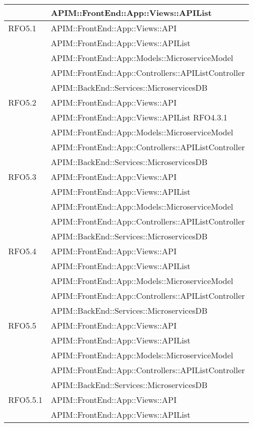 \begin{longtable}{ p{4cm} | p{12cm} }
			& APIM::FrontEnd::App::Views::APIList \\
			\hline		
			RFO5.1
			& APIM::FrontEnd::App::Views::API \\
			& APIM::FrontEnd::App::Views::APIList \\
			& APIM::FrontEnd::App::Models::MicroserviceModel \\
			& APIM::FrontEnd::App::Controllers::APIListController \\
			& APIM::BackEnd::Services::MicroservicesDB \\
			\hline		
			RFO5.2
			& APIM::FrontEnd::App::Views::API \\
			& APIM::FrontEnd::App::Views::APIList RFO4.3.1 \\
			& APIM::FrontEnd::App::Models::MicroserviceModel \\
			& APIM::FrontEnd::App::Controllers::APIListController \\
			& APIM::BackEnd::Services::MicroservicesDB \\
			\hline		
			RFO5.3
			& APIM::FrontEnd::App::Views::API \\
			& APIM::FrontEnd::App::Views::APIList \\
			& APIM::FrontEnd::App::Models::MicroserviceModel \\
			& APIM::FrontEnd::App::Controllers::APIListController \\
			& APIM::BackEnd::Services::MicroservicesDB \\
			\hline		
			RFO5.4
			& APIM::FrontEnd::App::Views::API \\
			& APIM::FrontEnd::App::Views::APIList \\
			& APIM::FrontEnd::App::Models::MicroserviceModel \\
			& APIM::FrontEnd::App::Controllers::APIListController \\
			& APIM::BackEnd::Services::MicroservicesDB \\
			\hline		
			RFO5.5
			& APIM::FrontEnd::App::Views::API \\
			& APIM::FrontEnd::App::Views::APIList \\
			& APIM::FrontEnd::App::Models::MicroserviceModel \\
			& APIM::FrontEnd::App::Controllers::APIListController \\
			& APIM::BackEnd::Services::MicroservicesDB \\
			\hline		
			RFO5.5.1
			& APIM::FrontEnd::App::Views::API \\
			& APIM::FrontEnd::App::Views::APIList \\

\end{longtable}

